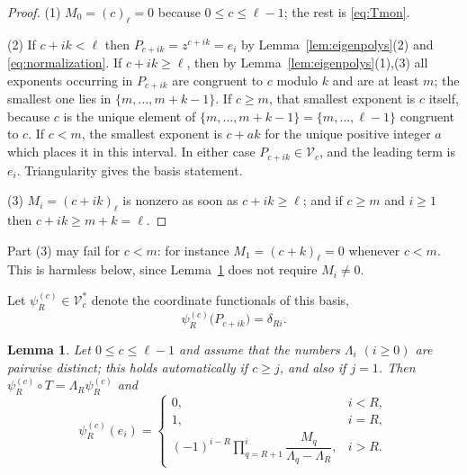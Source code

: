 \documentclass{amsart}
\newtheorem{lemma}[theorem]{Lemma}
\theoremstyle{definition}
\newcommand{\fall}[2]{(#1)_{#2}}
\begin{document}
\begin{proof}
(1) \(M_0=\fall{c}{\ell}=0\) because \(0\le c\le\ell-1\); the rest is
\eqref{eq:Tmon}.

(2) If \(c+ik<\ell\) then \(P_{c+ik}=z^{c+ik}=e_i\) by
Lemma~\ref{lem:eigenpolys}(2) and \eqref{eq:normalization}.  If
\(c+ik\ge\ell\), then by Lemma~\ref{lem:eigenpolys}(1),(3) all exponents
occurring in \(P_{c+ik}\) are congruent to \(c\) modulo \(k\) and are at
least \(m\); the smallest one lies in \(\{m,\dots,m+k-1\}\).  If \(c\ge m\),
that smallest exponent is \(c\) itself, because \(c\) is the unique element
of \(\{m,\dots,m+k-1\}=\{m,\dots,\ell-1\}\) congruent to \(c\).  If
\(c<m\), the smallest exponent is \(c+ak\) for the unique positive integer
\(a\) which places it in this interval.  In either case
\(P_{c+ik}\in\mathcal V_c\), and the leading term is \(e_i\).  Triangularity gives the basis statement.

(3) \(M_i=\fall{c+ik}{\ell}\) is nonzero as soon as \(c+ik\ge\ell\); and if
\(c\ge m\) and \(i\ge1\) then \(c+ik\ge m+k=\ell\).
\end{proof}

Part (3) may fail for \(c<m\): for instance \(M_1=\fall{c+k}{\ell}=0\)
whenever \(c<m\).  This is harmless below, since
Lemma~\ref{lem:coordinate} does not require \(M_i\ne0\).

Let \(\psi^{(c)}_R\in\mathcal V_c^{*}\) denote the coordinate functionals of
this basis,
\[
\psi^{(c)}_R\bigl(P_{c+ik}\bigr)=\delta_{Ri}.
\]

\begin{lemma}\label{lem:coordinate}
Let \(0\le c\le\ell-1\) and assume that the numbers \(\Lambda_i\)
\((i\ge0)\) are pairwise distinct; this holds automatically if \(c\ge j\),
and also if \(j=1\).  Then \(\psi^{(c)}_R\circ T=\Lambda_R\psi^{(c)}_R\) and
\begin{equation}\label{eq:coordinate}
\psi^{(c)}_R(e_i)=
\begin{cases}
0,&i<R,\\[2pt]
1,&i=R,\\[2pt]
\displaystyle(-1)^{i-R}\prod_{q=R+1}^{i}
\dfrac{M_q}{\Lambda_q-\Lambda_R},&i>R.
\end{cases}
\end{equation}
\end{lemma}
\end{document}
